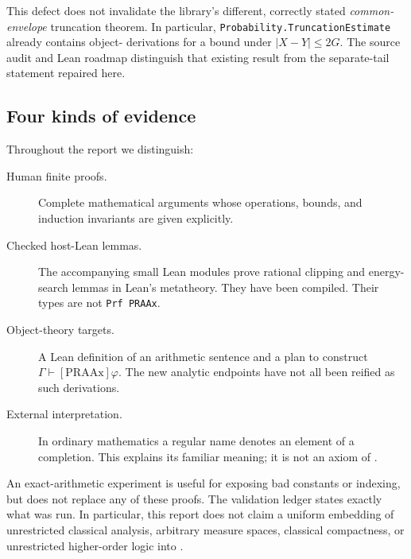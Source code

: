 This defect does not invalidate the library's different, correctly stated
\emph{common-envelope} truncation theorem. In particular,
\texttt{Probability.TruncationEstimate} already contains object-\ipra
derivations for a bound under \(|X-Y|\leq2G\). The source audit and Lean
roadmap distinguish that existing result from the separate-tail statement
repaired here.

\subsection{Four kinds of evidence}

Throughout the report we distinguish:
\begin{description}
\item[Human finite proofs.] Complete mathematical arguments whose
operations, bounds, and induction invariants are given explicitly.
\item[Checked host-Lean lemmas.] The accompanying small Lean modules
prove rational clipping and energy-search lemmas in Lean's metatheory.
They have been compiled. Their types are not \texttt{Prf PRAAx}.
\item[Object-theory targets.] A Lean definition of an arithmetic sentence
and a plan to construct \(\Gamma\vdash[\mathrm{PRAAx}]\varphi\).
The new analytic endpoints have not all been reified as such derivations.
\item[External interpretation.] In ordinary mathematics a regular name
denotes an element of a completion. This explains its familiar meaning;
it is not an axiom of \ipra.
\end{description}

An exact-arithmetic experiment is useful for exposing bad constants or
indexing, but does not replace any of these proofs. The validation ledger
states exactly what was run. In particular, this report does not claim a
uniform embedding of unrestricted classical analysis, arbitrary measure
spaces, classical compactness, or unrestricted higher-order logic into
\ipra.
